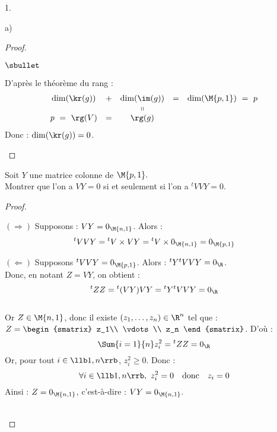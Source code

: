\begin{noliste}{1.}
\begin{noliste}{a)}
\begin{proof}
\begin{noliste}{$\sbullet$}
    
    \item D'après le théorème du rang :
    \[
     \begin{array}{ccccc}
      \dim(\kr(g)) & + & \dim(\im(g)) & = & \dim(\M{p,1}) \ = \ p
      \\
       & & \shortparallel 
      \\
      p \ = \ \rg(V) & = & \rg(g)
     \end{array}
    \]
    Donc : $\dim(\kr(g)) = 0$.
    ~\\[-1.6cm]
   \end{noliste}
  \end{proof}
  
  \item Soit $Y$ une matrice colonne de $\M{p,1}.$\\
  Montrer que l'on a $VY=0$ si et seulement si l'on a ${}^t{}VVY=0$.
  
  \begin{proof}~
   \begin{liste}{\quad}
    \item[$(\Rightarrow)$]
    Supposons : $VY=0_{\M{n,1}}$. Alors :
    \[
     {}^t{}VVY = {}^t{}V \times VY = {}^t{} V \times 0_{\M{n,1}}
     = 0_{\M{p,1}}
    \]
    
    \item[$(\Leftarrow)$]
    Supposons ${}^t{}VVY=0_{\M{p,1}}$. Alors : ${}^t{} Y {}^t{} V
    VY=0_{\R}$. \\[.1cm]
    Donc, en notant $Z=VY$, on obtient :
    \[
     {}^t{}ZZ= {}^t{}(VY)VY = {}^t{}Y {}^t{} VVY=0_{\R}
    \]~\\[-.4cm]
    Or $Z\in \M{n,1}$, donc il existe $(z_1, \ldots, z_n) \in \R^n$
    tel que : $Z=
    \begin{smatrix}
     z_1\\
     \vdots \\
     z_n
    \end{smatrix}$. D'où :~\\[-.4cm]
    \[
     \Sum{i=1}{n} z_i^2 = {}^t{}ZZ=0_{\R}
    \]
    Or, pour tout $i \in \llb 1, n\rrb$, $z_i^2 \geq 0$. Donc :
    \[
     \forall i \in \llb 1,n \rrb, \ z_i^2 =0 \quad \mbox{donc} 
     \quad z_i=0
    \]
    Ainsi : $Z=0_{\M{n,1}}$, c'est-à-dire : $VY=0_{\M{n,1}}$.
   \end{liste}
   ~\\[-1cm]
  \end{proof}
  

\end{noliste}
\end{noliste}
